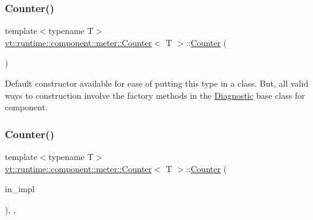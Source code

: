 \subsubsection{\texorpdfstring{Counter()}{Counter()}\hspace{0.1cm}{\footnotesize\ttfamily [1/2]}}
{\footnotesize\ttfamily template$<$typename T$>$ \\
\hyperlink{structvt_1_1runtime_1_1component_1_1meter_1_1_counter}{vt\+::runtime\+::component\+::meter\+::\+Counter}$<$ T $>$\+::\hyperlink{structvt_1_1runtime_1_1component_1_1meter_1_1_counter}{Counter} (\begin{DoxyParamCaption}{ }\end{DoxyParamCaption})\hspace{0.3cm}{\ttfamily [default]}}



Default constructor available for ease of putting this type in a class. But, all valid ways to construction involve the factory methods in the {\ttfamily \hyperlink{structvt_1_1runtime_1_1component_1_1_diagnostic}{Diagnostic}} base class for component. 

\mbox{\label{structvt_1_1runtime_1_1component_1_1meter_1_1_counter_a649a29b69ce8db44fa9643820cd75080}} 
\subsubsection{\texorpdfstring{Counter()}{Counter()}\hspace{0.1cm}{\footnotesize\ttfamily [2/2]}}
{\footnotesize\ttfamily template$<$typename T$>$ \\
\hyperlink{structvt_1_1runtime_1_1component_1_1meter_1_1_counter}{vt\+::runtime\+::component\+::meter\+::\+Counter}$<$ T $>$\+::\hyperlink{structvt_1_1runtime_1_1component_1_1meter_1_1_counter}{Counter} (\begin{DoxyParamCaption}\item[{\hyperlink{structvt_1_1runtime_1_1component_1_1detail_1_1_diagnostic_value}{detail\+::\+Diagnostic\+Value}$<$ T $>$ $\ast$}]{in\+\_\+impl }\end{DoxyParamCaption})\hspace{0.3cm}{\ttfamily [inline]}, {\ttfamily [explicit]}, {\ttfamily [private]}}



